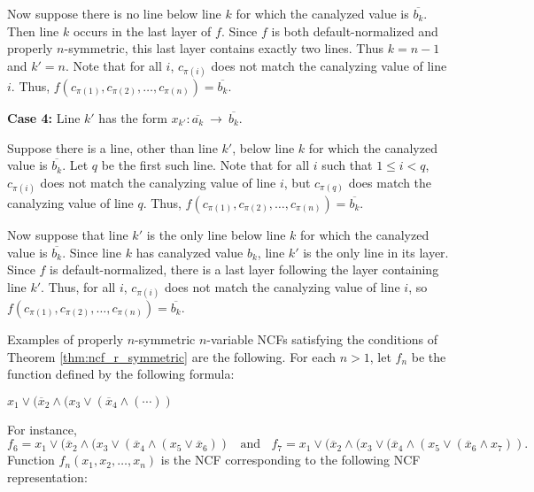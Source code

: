 Now suppose there is no line below line $k$ for which the canalyzed
value is $\overline{b_k}$.  Then line $k$ occurs in the last layer
of $f$.  Since $f$ is both default-normalized and properly $n$-symmetric,
this last layer contains exactly two lines.  Thus $k = n-1$ and $k'
= n$.  Note that for all $i$, $c_{\pi(i)}$ does not match the
canalyzing value of line $i$.  Thus, $f(c_{\pi(1)}, c_{\pi(2)},
\ldots, c_{\pi(n)}) = \overline{b_k}$.

\medskip

\noindent
{\bf Case 4:} Line $k'$ has the form $x_{k'} : \overline{a_k} ~\longrightarrow~ 
              \overline{b_k}$. 

\smallskip

Suppose there is a line, other than line $k'$, below line $k$ for
which the canalyzed value is $\overline{b_k}$.  Let $q$ be the
first such line.  Note that for all $i$ such that $1 \leq i < q$,
$c_{\pi(i)}$ does not match the canalyzing value of line $i$, but
$c_{\pi(q)}$ does match the canalyzing value of line $q$.  Thus,
$f(c_{\pi(1)}, c_{\pi(2)}, \ldots, c_{\pi(n)}) = \overline{b_k}$.

Now suppose that line $k'$ is the only line below line $k$ for which
the canalyzed value is $\overline{b_k}$.  Since line $k$ has
canalyzed value $b_k$, line $k'$ is the only line in its layer.
Since $f$ is default-normalized, there is a last layer following the layer
containing line $k'$.  Thus, for all $i$, $c_{\pi(i)}$ does not
match the canalyzing value of line $i$, so $f(c_{\pi(1)}, c_{\pi(2)},
\ldots, c_{\pi(n)}) = \overline{b_k}$.  \QED

\medskip

Examples of properly $n$-symmetric $n$-variable NCFs satisfying the
conditions of Theorem \ref{thm:ncf_r_symmetric} are the following.
For each $n > 1$, let $f_n$ be the function defined by the following
formula:

\smallskip

\hspace*{1in} $x_1 \vee (\overline{x}_2 \wedge ( x_3 \vee (\overline{x}_4 \wedge (\cdots ))$

\smallskip

\noindent
For instance,
\[
f_6 = x_1 \vee (\overline{x}_2 \wedge (x_3 \vee (\overline{x}_4 \wedge (x_5 \vee \overline{x}_6))
~~~~\mathrm{and}~~~~
f_7 = x_1 \vee (\overline{x}_2 \wedge (x_3 \vee (\overline{x}_4 \wedge (x_5 
          \vee (\overline{x}_6 \wedge  x_7)).
\]
Function $f_n(x_1, x_2, \ldots, x_n)$ is the NCF corresponding to
the following NCF representation:

